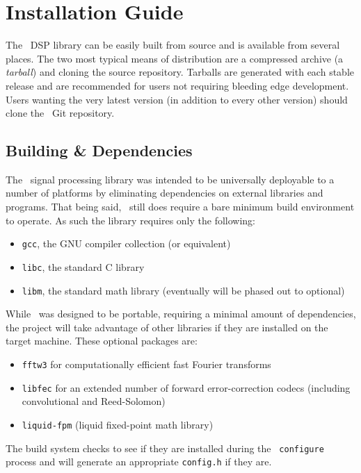 % 
%

\newpage
\section{Installation Guide}
\label{section:installation}
The \liquid\ DSP library can be easily built from source and is
available from several places.
The two most typical means of distribution are a compressed archive
(a {\em tarball}) and cloning the source repository.
Tarballs are generated with each stable release and are recommended for
users not requiring bleeding edge development.
Users wanting the very latest version (in addition to every other
version) should clone the \liquid\ Git repository.

\subsection{Building \& Dependencies}
\label{section:installation:building}
The \liquid\ signal processing library was intended to be universally
deployable to a number of platforms by eliminating dependencies on
external libraries and programs.
That being said, \liquid\ still does require a bare minimum build
environment to operate.
As such the library requires only the following:
%
\begin{itemize}
\item {\tt gcc}, the GNU compiler collection (or equivalent)
\item {\tt libc}, the standard C library
\item {\tt libm}, the standard math library (eventually will be phased
      out to optional)
\end{itemize}
%
While \liquid\ was designed to be portable,
requiring a minimal amount of dependencies,
the project will take advantage of other libraries if they are installed
on the target machine.
These optional packages are:
%
\begin{itemize}
\item {\tt fftw3} for computationally efficient fast Fourier transforms
\item {\tt libfec} for an extended number of forward error-correction
      codecs (including convolutional and Reed-Solomon)
\item {\tt liquid-fpm} (liquid fixed-point math library)
\end{itemize}
%
The build system checks to see if they are installed during the {\tt
configure} process and will generate an appropriate {\tt config.h} if
they are.

